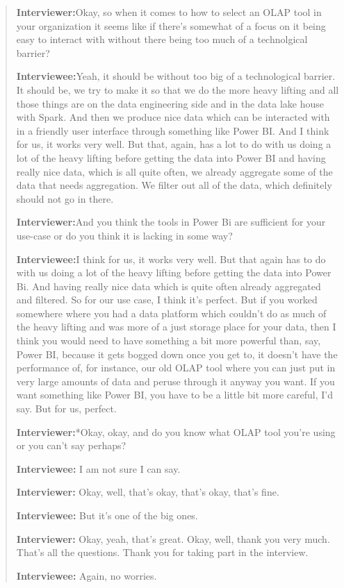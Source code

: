 \begin{quote}
    \textbf{Interviewer:}Okay, so when it comes to how to select an OLAP tool in your organization it seems like if there's somewhat of a focus on it being easy to interact with without there being too much of a technolgical barrier?

    \textbf{Interviewee:}Yeah, it should be without too big of a technological barrier.
    It should be, we try to make it so that we do the more heavy lifting and all those things are on the data engineering side and in the data lake house with Spark.
    And then we produce nice data which can be interacted with in a friendly user interface through something like Power BI.
    And I think for us, it works very well.
    But that, again, has a lot to do with us doing a lot of the heavy lifting before getting the data into Power BI
    and having really nice data, which is all quite often,
    we already aggregate some of the data that needs aggregation.
    We filter out all of the data, which definitely should not go in there.

    \textbf{Interviewer:}And you think the tools in Power Bi are sufficient for your use-case or do you think it is lacking in some way?

    \textbf{Interviewee:}I think for us, it works very well. But that again has to do with us doing a lot of the heavy lifting before getting the data into Power Bi. And having really nice data which is quite often already aggregated and filtered. So for our use case, I think it's perfect.
    But if you worked somewhere where you had a data platform which couldn't do as much of the heavy lifting and was more of a just storage place for your data,
    then I think you would need to have something a bit more powerful than, say, Power BI, because it gets bogged down once you get to, it doesn't have the performance of, for instance, our old OLAP tool where you can just put in very large amounts of data and peruse through it anyway you want.
    If you want something like Power BI, you have to be a little bit more careful, I'd say.
    But for us, perfect.

    \textbf{Interviewer:}*Okay, okay, and do you know what OLAP tool you're using or you can't say perhaps?

    \textbf{Interviewee:} I am not sure I can say.

    \textbf{Interviewer:} Okay, well, that's okay, that's okay, that's fine.

    \textbf{Interviewee:} But it's one of the big ones.

    \textbf{Interviewer:} Okay, yeah, that's great. Okay, well, thank you very much. That's all the questions. Thank you for taking part in the interview.

    \textbf{Interviewee:} Again, no worries.

\end{quote}